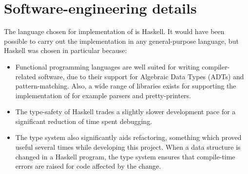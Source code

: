 




\section{Software-engineering details}
The language chosen for implementation of \libsme{} is Haskell. It would have
been possible to carry out the implementation in any general-purpose language,
but Haskell was chosen in particular because:
\begin{itemize}
\item Functional programming languages are well suited for writing
  compiler-related software, due to their support for Algebraic Data Types
  (ADTs) and pattern-matching. Also, a wide range of libraries exists for
  supporting the implementation of for example parsers and pretty-printers.
\item The type-safety of Haskell trades a slightly slower development pace for a
  significant reduction of time spent debugging.
\item The type system also significantly aids refactoring, something which
  proved useful several times while developing this project. When a data
  structure is changed in a Haskell program, the type system ensures that
  compile-time errors are raised for code affected by the change.
\end{itemize}

